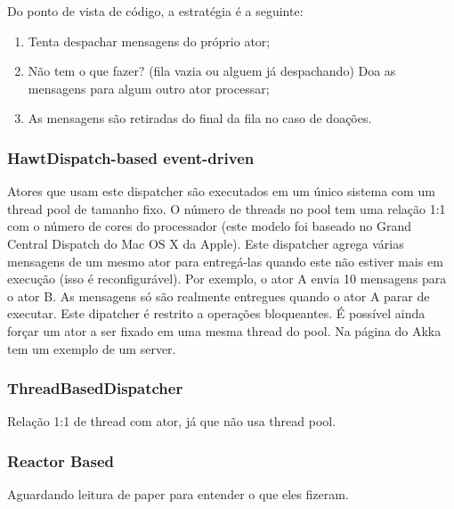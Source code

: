 \documentclass[]{article}
\begin{document}
			Do ponto de vista de código, a estratégia é a seguinte: 
			\begin{enumerate}
				\item Tenta despachar mensagens do próprio ator;
				\item Não tem o que fazer? (fila vazia ou alguem já despachando) Doa as mensagens para algum outro ator processar;
				\item As mensagens são retiradas do final da fila no caso de doações.
			\end{enumerate}
			
			\subsubsection{HawtDispatch-based event-driven}
			Atores que usam este dispatcher são executados em um único sistema com um thread pool de tamanho fixo. O número
			de threads no pool tem uma relação 1:1 com o número de cores do processador (este modelo foi baseado no Grand Central 
			Dispatch do Mac OS X da Apple). Este dispatcher agrega várias mensagens de um mesmo ator para entregá-las quando
			este não estiver mais em execução (isso é reconfigurável). Por exemplo, o ator A envia 10 mensagens para o ator B. 
			As mensagens só são realmente entregues quando o ator A parar de executar. Este dipatcher é restrito a operações
			bloqueantes. É possível ainda forçar um ator a ser fixado em uma mesma thread do pool. Na página do Akka tem um exemplo
			de um server.
			
			\subsubsection{ThreadBasedDispatcher}
			Relação 1:1 de thread com ator, já que não usa thread pool.
			
			\subsubsection{Reactor Based}
			Aguardando leitura de paper para entender o que eles fizeram.



			 
\newpage


\end{document}
